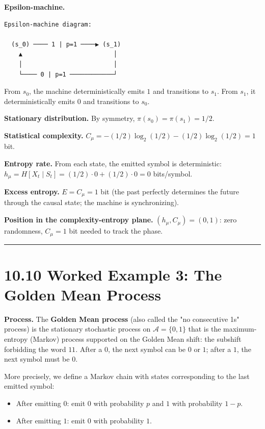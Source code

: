\textbf{Epsilon-machine.}

\begin{lstlisting}
Epsilon-machine diagram:

  (s_0) ──── 1 | p=1 ────▶ (s_1)
    ▲                         │
    │                         │
    └──── 0 | p=1 ────────────┘
\end{lstlisting}

From $s_0$, the machine deterministically emits $1$ and transitions to $s_1$. From $s_1$, it deterministically emits $0$ and transitions to $s_0$.

\textbf{Stationary distribution.} By symmetry, $\pi(s_0) = \pi(s_1) = 1/2$.

\textbf{Statistical complexity.} $C_\mu = -(1/2)\log_2(1/2) - (1/2)\log_2(1/2) = 1$ bit.

\textbf{Entropy rate.} From each state, the emitted symbol is deterministic: $h_\mu = H[X_t \mid S_t] = (1/2)\cdot 0 + (1/2) \cdot 0 = 0$ bits/symbol.

\textbf{Excess entropy.} $E = C_\mu = 1$ bit (the past perfectly determines the future through the causal state; the machine is synchronizing).

\textbf{Position in the complexity-entropy plane.} $(h_\mu, C_\mu) = (0, 1)$: zero randomness, $C_\mu = 1$ bit needed to track the phase.

\bigskip\hrule\bigskip

\section{10.10 Worked Example 3: The Golden Mean Process}

\textbf{Process.} The \textbf{Golden Mean process} (also called the "no consecutive 1s" process) is the stationary stochastic process on $\mathcal{A} = \{ 0, 1\} $ that is the maximum-entropy (Markov) process supported on the Golden Mean shift: the subshift forbidding the word $11$. After a $0$, the next symbol can be $0$ or $1$; after a $1$, the next symbol must be $0$.

More precisely, we define a Markov chain with states corresponding to the last emitted symbol:

\begin{itemize}
  \item After emitting $0$: emit $0$ with probability $p$ and $1$ with probability $1-p$.
  \item After emitting $1$: emit $0$ with probability $1$.
\end{itemize}

